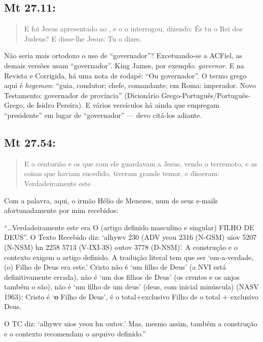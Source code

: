 \subsection*{Mt 27.11:}\label{govern}
\begin{quote}
 \small
 E foi Jesus apresentado ao , e o  o interrogou, dizendo: És tu o Rei dos Judeus? E disse-lhe Jesus: Tu o dizes.
\end{quote}

Não seria mais ortodoxo o uso de ``governador''? Excetuando-se a ACFiel, as demais versões usam ``governador''. King James, por exemplo: \emph{governor}. E na Revista e Corrigida, há uma nota de rodapé: ``Ou governador''. O termo grego aqui é \emph{hegemon}: ``guia, condutor; chefe, comandante; em Roma: imperador. Novo
Testamento: governador de província'' (Dicionário Grego-Português/Português-Grego, de Isidro Pereira). E vários versículos há ainda que empregam ``presidente'' em lugar de ``governador'' --- devo citá-los adiante.


\subsection*{Mt 27.54:}
\begin{quote}
 \small
 E o centurião e os que com ele guardavam a Jesus, vendo o terremoto, e as coisas que haviam sucedido, tiveram grande temor, e disseram: Verdadeiramente este .
\end{quote}

Com a palavra, aqui, o irmão Hélio de Menezes, num de seus e-mails afortunadamente por mim recebidos:

``\ldots Verdadeiramente este era O (artigo definido masculino e singular)
FILHO DE DEUS''. O Texto Recebido diz: `alhywv 230 (ADV yeou 2316 (N-GSM)
uiov 5207 (N-NSM) hn 2258 5713 (V-IXI-3S) outov 3778 (D-NSM)'. A
construção e o contexto exigem o artigo definido. A tradução literal tem
que ser `em-a-verdade, (o) Filho de Deus era este.' Cristo não é `um
filho de Deus' (a NVI está definitivamente errada), não é `um dos filhos
de Deus' (os crentes e os anjos também o são), não é `um filho de um
deus' (deus, com inicial minúscula) (NASV 1963): Cristo é `\textbf{o}
Filho de Deus', é o total+exclusivo Filho de o total $+$ exclusivo Deus.

O TC diz: `alhywv uios yeou hn outov.' Mas, mesmo assim, também a
construção e o contexto recomendam o arquivo definido.''

